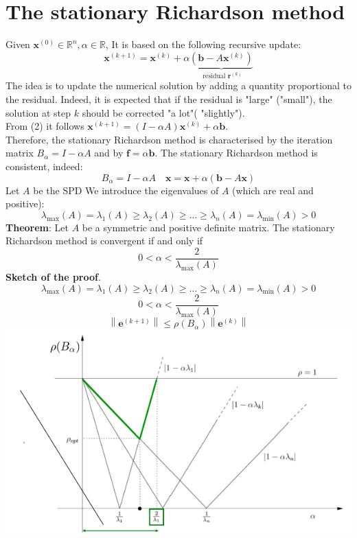 \documentclass[11pt]{book}
\begin{document}
\section*{The stationary Richardson method}
Given $\mathbf{x}^{(0)} \in \mathbb{R}^{n}, \alpha \in \mathbb{R}$, It is based on the following recursive update:
$$
\boldsymbol{x}^{(k+1)}=\boldsymbol{x}^{(k)}+\alpha \underbrace{\left(\boldsymbol{b}-A \boldsymbol{x}^{(k)}\right)}_{\text { residual } \boldsymbol{r}^{(k)}}
$$
The idea is to update the numerical solution by adding a quantity proportional to the residual. Indeed, it is expected that if the residual is "large" ("small"), the solution at step $k$ should be corrected "a lot"( "slightly").\\
From (2) it follows $\mathbf{x}^{(k+1)}=(I-\alpha A) \mathbf{x}^{(k)}+\alpha \mathbf{b}$.\\
Therefore, the stationary Richardson method is characterised by the iteration matrix $B_{\alpha}=I-\alpha A$ and by $\mathbf{f}=\alpha \mathbf{b}$.
The stationary Richardson method is consistent, indeed:
$$
B_{\alpha}=I-\alpha A \quad \mathbf{x}=\mathbf{x}+\alpha(\mathbf{b}-A \mathbf{x})
$$
Let $A$ be the SPD
We introduce the eigenvalues of $A$ (which are real and positive):
$$
\lambda_{\max }(A)=\lambda_{1}(A) \geq \lambda_{2}(A) \geq \ldots \geq \lambda_{n}(A)=\lambda_{\min }(A)>0
$$
\textbf{Theorem}: Let $A$ be a symmetric and positive definite matrix. The stationary Richardson method is convergent if and only if
$$
0<\alpha<\frac{2}{\lambda_{\max }(A)}
$$
\textbf{Sketch of the proof}.
$$
\lambda_{\max }(A)=\lambda_1(A) \geq \lambda_2(A) \geq \ldots \geq \lambda_n(A)=\lambda_{\min }(A)>0
$$
$$
0<\alpha<\frac{2}{\lambda_{\max }(A)}
$$
$$
\left\|\boldsymbol{e}^{(k+1)}\right\| \leq \rho\left(B_\alpha\right)\left\|\boldsymbol{e}^{(k)}\right\|
$$
\includegraphics[scale=0.7]{images/Richardson0.png}\\
\end{document}
